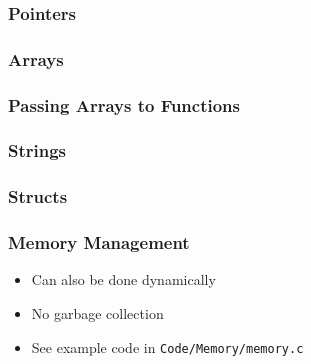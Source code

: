 \documentclass{beamer}
\begin{document}
\begin{frame}
    \frametitle{Pointers}
    \begin{figure}
        
    \end{figure}
\end{frame}

\begin{frame}
    \frametitle{Arrays}
    \begin{figure}
        
    \end{figure}
\end{frame}

\begin{frame}
    \frametitle{Passing Arrays to Functions}
    \begin{figure}
        
    \end{figure}
\end{frame}

\begin{frame}
    \frametitle{Strings}
    \begin{figure}
        
    \end{figure}
\end{frame}

\begin{frame}
    \frametitle{Structs}
    \begin{figure}
        
    \end{figure}
\end{frame}

\begin{frame}
    \frametitle{Memory Management}
    \begin{itemize}[<+->]
        \item Can also be done dynamically
        \item No garbage collection
        \item See example code in \texttt{Code/Memory/memory.c}
    \end{itemize}
\end{frame}
\end{document}
